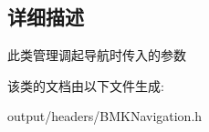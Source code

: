 \subsection{详细描述}
此类管理调起导航时传入的参数 

该类的文档由以下文件生成\+:\begin{DoxyCompactItemize}
\item 
output/headers/B\+M\+K\+Navigation.\+h\end{DoxyCompactItemize}
